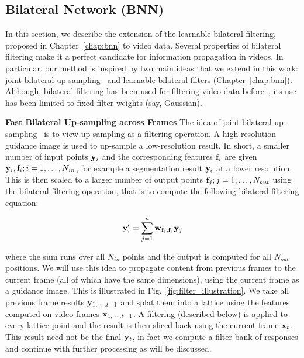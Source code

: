 \subsection{Bilateral Network (BNN)}\label{sec:bilateralnetwork}
In this section, we describe the extension of the learnable bilateral filtering, proposed in
Chapter~\ref{chap:bnn} to video data.
Several properties of bilateral filtering make it a perfect candidate for information propagation in videos.
In particular, our method is inspired by two main ideas that we extend in this work: joint bilateral up-sampling~\cite{kopf2007joint} and learnable bilateral filters (Chapter~\ref{chap:bnn}). Although,
bilateral filtering has been used for filtering video data before~\cite{paris2008edge},
its use has been limited to fixed filter weights (say, Gaussian).

{\bf Fast Bilateral Up-sampling across Frames} The idea of joint bilateral up-sampling~\cite{kopf2007joint}
is to view up-sampling as a filtering operation.
A high resolution guidance image is used to up-sample a low-resolution result.
In short, a smaller number of input points $\mathbf{y}_i$ and the corresponding features $\mathbf{f}_i$
are given $\mathbf{y}_i,\mathbf{f}_i; i=1,\ldots,N_{in}$, for example a segmentation result $\mathbf{y}_i$ at a lower resolution.
This is then scaled to a larger number of output points $\mathbf{f}_j;j=1,\ldots,N_{out}$ using the
bilateral filtering operation, that is to compute the following bilateral filtering equation:

\begin{equation}
  \mathbf{y}'_i = \sum_{j=1}^n \mathbf{w}_{\mathbf{f}_i,\mathbf{f}_j} \mathbf{y}_j
  \label{eq:bilateral2}
\end{equation}

where the sum runs over all $N_{in}$ points and the output is computed for all $N_{out}$ positions.
We will use this idea to propagate content from previous frames to the current frame (all of which have the same dimensions), using the current frame as a guidance image.
This is illustrated in Fig.~\ref{fig:filter_illustration}. We take all previous frame results $\mathbf{y}_{1,\cdots,t-1}$
 and splat them into a lattice using the features computed on video frames $\mathbf{x}_{1,\cdots,t-1}$.
A filtering (described below) is applied to every lattice point and the result is then sliced back using the
current frame $\mathbf{x}_t$.
This result need not be the final $\mathbf{y}_t$, in fact we compute a filter bank of responses and continue with further
processing as will be discussed.

